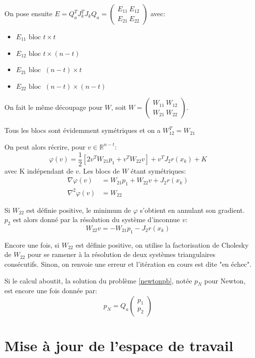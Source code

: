 \documentclass[a4paper,11pt]{article}
\newcommand{\real}{\mathbb{R}}
\numberwithin{equation}{section}
\begin{document}
On pose ensuite $E =  Q_{a}^TJ_{k}^TJ_{k}Q_{a} = \begin{pmatrix} E_{11}\ E_{12} \\ E_{21}\ E_{22} \end{pmatrix}$ avec:
\begin{itemize}
\item
$E_{11} \text{ bloc } t\times t$
\item
$E_{12} \text{ bloc } t\times (n-t)$
\item
$E_{21}\text{ bloc } \ (n-t)\times t$
\item
$E_{22}\text{ bloc }\ (n-t)\times (n-t)$
\end{itemize}

On fait le même découpage pour $W$, soit $W = \begin{pmatrix} W_{11}\ W_{12} \\ W_{21}\ W_{22} \end{pmatrix}$. 

Tous les blocs sont évidemment symétriques et on a $W_{12}^T = W_{21}$

On peut alors récrire, pour $v \in \real^{n-t}$: $$\varphi(v) = \dfrac{1}{2} \left[2v^TW_{21}p_1 + v^TW_{22}v\right] + v^TJ_2r(x_{k}) + K$$ avec K indépendant de $v$. Les blocs de $W$ étant symétriques:
$$ \begin{aligned}\nabla \varphi(v) &= W_{21}p_1 + W_{22}v + J_2r(x_{k}) \\
\nabla^2 \varphi(v) &= W_{22} \end{aligned}$$

Si $W_{22}$ est définie positive, le minimum de $\varphi$ s'obtient en annulant son gradient. $p_{2}$ est alors donné par la résolution du système d'inconnue $v$: $$W_{22}v = -W_{21}p_{1} -  J_2r(x_{k})$$ 

Encore une fois, si $W_{22}$ est définie positive, on utilise la factorisation de Cholesky de $W_{22}$ pour se ramener à la résolution de deux systèmes triangulaires consécutifs. Sinon, on renvoie une erreur et l'itération en cours est dite "en échec".

Si le calcul aboutit, la solution du problème \ref{newtonpb}, notée $p_{N}$ pour Newton, est encore une fois donnée par:
$$ p_{N} = Q_{a}\begin{pmatrix}p_{1}\\ p_{2} \end{pmatrix}$$


\section{Mise à jour de l'espace de travail} \label{working-set}
\end{document}
